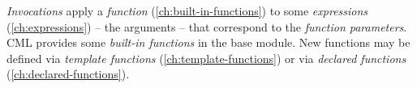 \emph{Invocations} apply a \emph{function} (\ref{ch:built-in-functions})
to some \emph{expressions} (\ref{ch:expressions})
-- the arguments --
that correspond to the \emph{function parameters}.
CML provides some \emph{built-in functions} in the base module.
New functions may be defined via
\emph{template functions} (\ref{ch:template-functions})
or via \emph{declared functions} (\ref{ch:declared-functions}).
